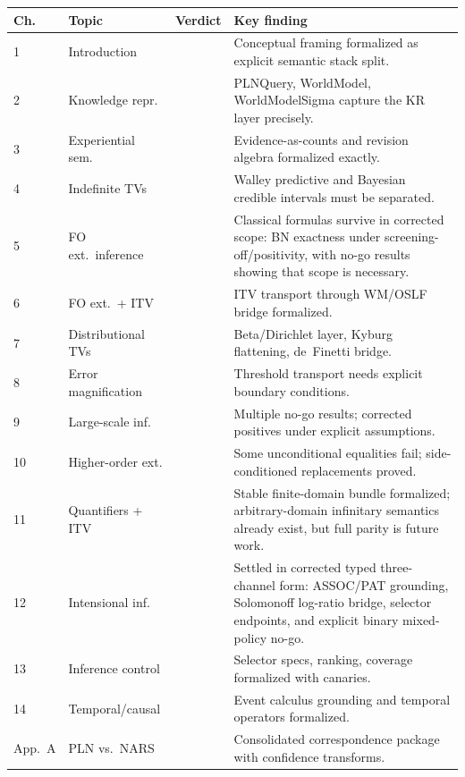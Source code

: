 \documentclass[11pt,openany]{report}
\begin{document}
\begin{longtable}{p{}p{}p{}p{}}
\textbf{Ch.} & \textbf{Topic} & \textbf{Verdict} & \textbf{Key finding} \\
\hline
1 & Introduction & \verdictClean{} & Conceptual framing formalized as explicit semantic stack split. \\
2 & Knowledge repr. & \verdictClean{} & PLNQuery, WorldModel, WorldModelSigma capture the KR layer precisely. \\
3 & Experiential sem. & \verdictClean{} & Evidence-as-counts and revision algebra formalized exactly. \\
4 & Indefinite TVs & \verdictCorrected{} & Walley predictive and Bayesian credible intervals must be separated. \\
5 & FO ext.\ inference & \verdictCorrected{} & Classical formulas survive in corrected scope: BN exactness under screening-off/positivity, with no-go results showing that scope is necessary. \\
6 & FO ext.\ + ITV & \verdictClean{} & ITV transport through WM/OSLF bridge formalized. \\
7 & Distributional TVs & \verdictClean{} & Beta/Dirichlet layer, Kyburg flattening, de~Finetti bridge. \\
8 & Error magnification & \verdictCorrected{} & Threshold transport needs explicit boundary conditions. \\
9 & Large-scale inf. & \verdictNoGo{} & Multiple no-go results; corrected positives under explicit assumptions. \\
10 & Higher-order ext. & \verdictCorrected{} & Some unconditional equalities fail; side-conditioned replacements proved. \\
11 & Quantifiers + ITV & \verdictAssumption{} & Stable finite-domain bundle formalized; arbitrary-domain infinitary semantics already exist, but full parity is future work. \\
12 & Intensional inf. & \verdictCorrected{} & Settled in corrected typed three-channel form: ASSOC/PAT grounding, Solomonoff log-ratio bridge, selector endpoints, and explicit binary mixed-policy no-go. \\
13 & Inference control & \verdictClean{} & Selector specs, ranking, coverage formalized with canaries. \\
14 & Temporal/causal & \verdictClean{} & Event calculus grounding and temporal operators formalized. \\
App.\ A & PLN vs.\ NARS & \verdictClean{} & Consolidated correspondence package with confidence transforms. \\
\hline
\end{longtable}
\end{document}

